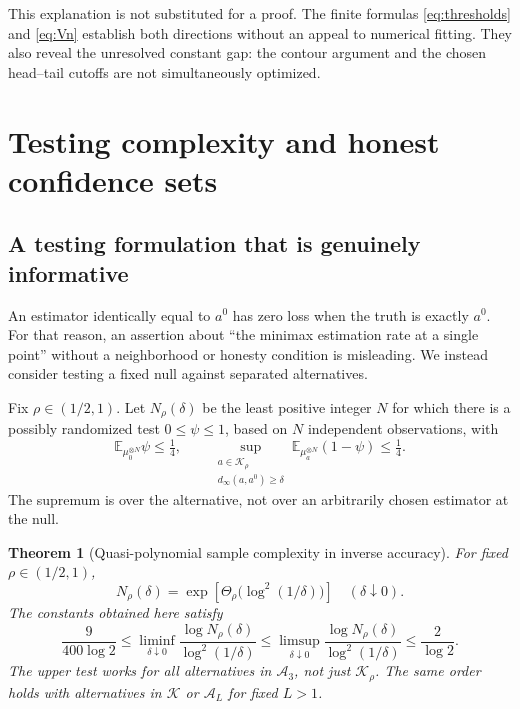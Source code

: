 \documentclass[11pt,a4paper]{article}
\numberwithin{equation}{section}
\newtheorem{theorem}{Theorem}[section]
\theoremstyle{definition}
\theoremstyle{remark}
\newcommand{\E}{\mathbb E}
\newcommand{\A}{\mathcal A}
\newcommand{\K}{\mathcal K}
\begin{document}
This explanation is not substituted for a proof. The finite formulas
\eqref{eq:thresholds} and \eqref{eq:Vn} establish both directions without
an appeal to numerical fitting. They also reveal the unresolved constant gap:
the contour argument and the chosen head--tail cutoffs are not simultaneously
optimized.

\section{Testing complexity and honest confidence sets}
\label{sec:statistics}

\subsection{A testing formulation that is genuinely informative}

An estimator identically equal to $a^0$ has zero loss when the truth is exactly
$a^0$. For that reason, an assertion about ``the minimax estimation rate at a
single point'' without a neighborhood or honesty condition is misleading.
We instead consider testing a fixed null against separated alternatives.

Fix $\rho\in(1/2,1)$. Let $N_\rho(\delta)$ be the least positive integer
$N$ for which there is a possibly randomized test $0\le\psi\le1$, based
on $N$ independent observations, with
\begin{equation}
 \E_{\mu_0^{\otimes N}}\psi\le\tfrac14,
 \qquad
 \sup_{\substack{a\in\K_\rho\\d_\infty(a,a^0)\ge\delta}}
       \E_{\mu_a^{\otimes N}}(1-\psi)\le\tfrac14.
 \label{eq:test-definition}
\end{equation}
The supremum is over the alternative, not over an arbitrarily chosen estimator
at the null.

\begin{theorem}[Quasi-polynomial sample complexity in inverse accuracy]
\label{thm:testing}
For fixed $\rho\in(1/2,1)$,
\begin{equation}
 N_\rho(\delta)=
 \exp\left[\Theta_\rho\bigl(\log^2(1/\delta)\bigr)\right]
 \quad(\delta\downarrow0).
 \label{eq:testing}
\end{equation}
The constants obtained here satisfy
\begin{equation}
 \frac9{400\log2}
 \le\liminf_{\delta\downarrow0}
       \frac{\log N_\rho(\delta)}{\log^2(1/\delta)}
 \le\limsup_{\delta\downarrow0}
       \frac{\log N_\rho(\delta)}{\log^2(1/\delta)}
 \le\frac2{\log2}.
 \label{eq:testing-constants}
\end{equation}
The upper test works for all alternatives in $\A_3$, not just $\K_\rho$.
The same order holds with alternatives in $\K$ or $\A_L$ for fixed $L>1$.
\end{theorem}
\end{document}
